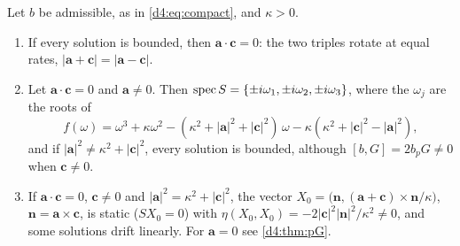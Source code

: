 \begin{theorem}
\label{d4:thm:screen}
Let $b$ be admissible, as in \eqref{d4:eq:compact}, and $\kappa>0$.
\begin{enumerate}[label=(\roman*),leftmargin=2.2em]
\item If every solution is bounded, then $\mathbf a\cdot\mathbf c=0$: the two triples rotate at equal rates, $|\mathbf a+\mathbf c|=|\mathbf a-\mathbf c|$.
\item Let $\mathbf a\cdot\mathbf c=0$ and $\mathbf a\neq0$. Then $\operatorname{spec} S=\{\pm i\omega_1,\pm i\omega_2,\pm i\omega_3\}$, where the $\omega_j$ are the roots of
\[
f(\omega)=\omega^3+\kappa\omega^2-(\kappa^2+|\mathbf a|^2+|\mathbf c|^2)\,\omega-\kappa(\kappa^2+|\mathbf c|^2-|\mathbf a|^2),
\]
and if $|\mathbf a|^2\neq\kappa^2+|\mathbf c|^2$, every solution is bounded, although $[b,G]=2b_pG\neq0$ when $\mathbf c\neq0$.
\item If $\mathbf a\cdot\mathbf c=0$, $\mathbf c\neq0$ and $|\mathbf a|^2=\kappa^2+|\mathbf c|^2$, the vector $X_0=\bigl(\mathbf n,(\mathbf a+\mathbf c)\times\mathbf n/\kappa\bigr)$,
$\mathbf n=\mathbf a\times\mathbf c$, is static ($SX_0=0$) with $\eta(X_0,X_0)=-2|\mathbf c|^2|\mathbf n|^2/\kappa^2\neq0$, and some solutions drift linearly.
For $\mathbf a=0$ see \cref{d4:thm:pG}.
\end{enumerate}
\end{theorem}

